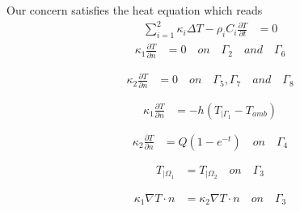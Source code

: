 Our concern satisfies the heat equation which reads 
\begin{equation}
\label{heat:eq}
   \begin{split}
      \displaystyle{\sum_{i=1}^{2} \kappa_i \Delta T - \rho_i C_i \frac{ \partial T}{\partial t}}  & = 0
  \end{split}
\end{equation}
\begin{equation}
\label{hom_neu1}
   \begin{split}
      \displaystyle{ \kappa_1 \frac{\partial T}{\partial n}} & =  0 \quad on \quad \Gamma_2 \quad and \quad \Gamma_6 \\ \\ 
  \end{split}
\end{equation}
\begin{equation}
\label{hom_neu2}
   \begin{split}
      \displaystyle{ \kappa_2 \frac{\partial T}{\partial n}} & =  0 \quad on \quad \Gamma_5 , \Gamma_7 \quad and \quad \Gamma_8 \\ \\ 
  \end{split}
\end{equation}
\begin{equation}
\label{classic_neu}
   \begin{split}
      \displaystyle{ \kappa_1 \frac{\partial T}{\partial n}} & = - h( T_{ | \Gamma_1 } - T_{amb}) \\ \\
  \end{split}
\end{equation}
\begin{equation}
\label{nonhom_neu}
   \begin{split}
      \displaystyle{ \kappa_2 \frac{\partial T}{\partial n}} & =  Q(1-e^{-t}) \quad on \quad \Gamma_4 \\ \\
  \end{split}
\end{equation}
\begin{equation}
\label{temp_conti}
   \begin{split}
      T_{| \varOmega_1} & = T_{| \varOmega_2} \quad on \quad \Gamma_3 \\ \\
  \end{split}
\end{equation}
\begin{equation}
\label{flux_conti}
   \begin{split}
      \displaystyle{ \kappa_1 \nabla T \cdot n} & = \displaystyle{ \kappa_2 \nabla T \cdot n \quad on \quad \Gamma_3} \\ \\
  \end{split}
\end{equation}

